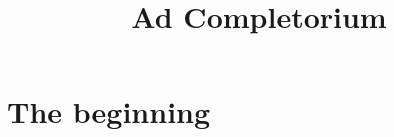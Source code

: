 \documentclass[ebook,12pt,twoside,openany]{memoir}
\title{Ad Completorium}
\begin{document}
\let\oldtextbf\textbf

\renewcommand\textbf[1]{%
    \pdfliteral direct {2 Tr 0.2 w}%
     \oldtextbf{#1}%
    \pdfliteral direct {0 Tr 0 w}%
}
\newcommand\embolden[1]{%
    \pdfliteral direct {2 Tr 0.2 w}%
     #1%
    \pdfliteral direct {0 Tr 0 w}%
}
\renewcommand\greboldfont[1]{%
    \pdfliteral direct {2 Tr 0.2 w}%
    \oldtextbf{#1}%
    \pdfliteral direct {0 Tr 0 w}%
}

\maketitle

\tableofcontents

\chapter{The beginning}





\end{document}
